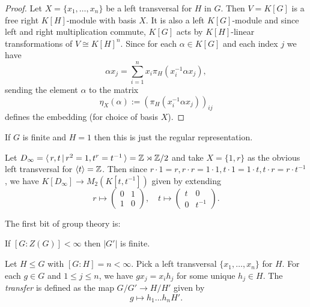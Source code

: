 \begin{proof}
    Let $X = \{x_1, \dots, x_n\}$ be a left transversal for $H$ in $G$.
    Then $V = K[G]$ is a free right $K[H]$-module with basis $X$.
    It is also a left $K[G]$-module and since left and right multiplication commute, $K[G]$ acts by $K[H]$-linear transformations of $V \cong K[H]^n$.
    Since for each $\alpha \in K[G]$ and each index $j$ we have \[
        \alpha x_j = \sum_{i=1}^n x_i \pi_H(x_i^{-1} \alpha x_j),
    \] sending the element $\alpha$ to the matrix \[
        \eta_X(\alpha) := \left( \pi_H(x_i^{-1} \alpha x_j) \right)_{ij}
    \] defines the embedding (for choice of basis $X$).

\end{proof}

\begin{remark}
    If $G$ is finite and $H = 1$ then this is just the regular representation.
\end{remark}

\begin{example}
    Let $D_\infty = \langle \, r, t \, | \, r^2 = 1, t^r = t^{-1} \, \rangle = \mathbb{Z} \rtimes \mathbb{Z}/2$ and take $X = \{1, r\}$ as the obvious left transversal for $\langle t \rangle = \mathbb{Z}$.
    Then since $r \cdot 1 = r, r \cdot r = 1 \cdot 1, t \cdot 1 = 1 \cdot t, t \cdot r = r \cdot t^{-1}$, we have $K[D_\infty] \to M_2(K[t, t^{-1}])$ given by extending \[
        r \mapsto \begin{pmatrix} 0 & 1 \\ 1 & 0 \end{pmatrix},
        \quad
        t \mapsto \begin{pmatrix} t & 0 \\ 0 & t^{-1} \end{pmatrix}.
    \]
\end{example}

The first bit of group theory is:

\begin{lemma}[Schur]
    \label{lemma:schur}
    If $[G : Z(G)] < \infty$ then $|G'|$ is finite.
\end{lemma}

\begin{definition}
    Let $H \leq G$ with $[G : H] = n < \infty$.
    Pick a left transversal $\{x_1, \dots, x_n\}$ for $H$.
    For each $g \in G$ and $1 \leq j \leq n$, we have $g x_j = x_i h_j$ for some unique $h_j \in H$.
    The \emph{transfer} is defined as the map $G / G' \to H / H'$ given by \[
        g \mapsto h_1 \dots h_n H'.
    \]
\end{definition}


